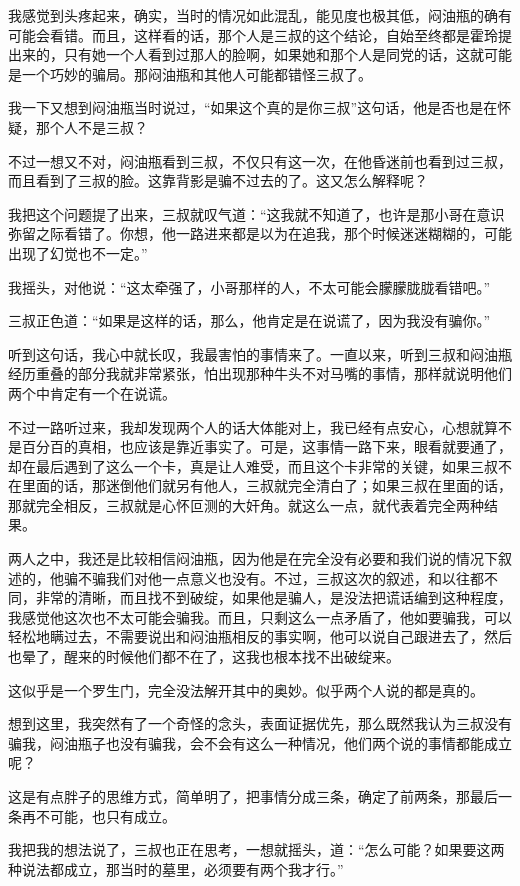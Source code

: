 我感觉到头疼起来，确实，当时的情况如此混乱，能见度也极其低，闷油瓶的确有可能会看错。而且，这样看的话，那个人是三叔的这个结论，自始至终都是霍玲提出来的，只有她一个人看到过那人的脸啊，如果她和那个人是同党的话，这就可能是一个巧妙的骗局。那闷油瓶和其他人可能都错怪三叔了。

我一下又想到闷油瓶当时说过，“如果这个真的是你三叔”这句话，他是否也是在怀疑，那个人不是三叔？

不过一想又不对，闷油瓶看到三叔，不仅只有这一次，在他昏迷前也看到过三叔，而且看到了三叔的脸。这靠背影是骗不过去的了。这又怎么解释呢？

我把这个问题提了出来，三叔就叹气道：“这我就不知道了，也许是那小哥在意识弥留之际看错了。你想，他一路进来都是以为在追我，那个时候迷迷糊糊的，可能出现了幻觉也不一定。”

我摇头，对他说：“这太牵强了，小哥那样的人，不太可能会朦朦胧胧看错吧。”

三叔正色道：“如果是这样的话，那么，他肯定是在说谎了，因为我没有骗你。”

听到这句话，我心中就长叹，我最害怕的事情来了。一直以来，听到三叔和闷油瓶经历重叠的部分我就非常紧张，怕出现那种牛头不对马嘴的事情，那样就说明他们两个中肯定有一个在说谎。

不过一路听过来，我却发现两个人的话大体能对上，我已经有点安心，心想就算不是百分百的真相，也应该是靠近事实了。可是，这事情一路下来，眼看就要通了，却在最后遇到了这么一个卡，真是让人难受，而且这个卡非常的关键，如果三叔不在里面的话，那迷倒他们就另有他人，三叔就完全清白了；如果三叔在里面的话，那就完全相反，三叔就是心怀叵测的大奸角。就这么一点，就代表着完全两种结果。

两人之中，我还是比较相信闷油瓶，因为他是在完全没有必要和我们说的情况下叙述的，他骗不骗我们对他一点意义也没有。不过，三叔这次的叙述，和以往都不同，非常的清晰，而且找不到破绽，如果他是骗人，是没法把谎话编到这种程度，我感觉他这次也不太可能会骗我。而且，只剩这么一点矛盾了，他如要骗我，可以轻松地瞒过去，不需要说出和闷油瓶相反的事实啊，他可以说自己跟进去了，然后也晕了，醒来的时候他们都不在了，这我也根本找不出破绽来。

这似乎是一个罗生门，完全没法解开其中的奥妙。似乎两个人说的都是真的。

想到这里，我突然有了一个奇怪的念头，表面证据优先，那么既然我认为三叔没有骗我，闷油瓶子也没有骗我，会不会有这么一种情况，他们两个说的事情都能成立呢？

这是有点胖子的思维方式，简单明了，把事情分成三条，确定了前两条，那最后一条再不可能，也只有成立。

我把我的想法说了，三叔也正在思考，一想就摇头，道：“怎么可能？如果要这两种说法都成立，那当时的墓里，必须要有两个我才行。”

